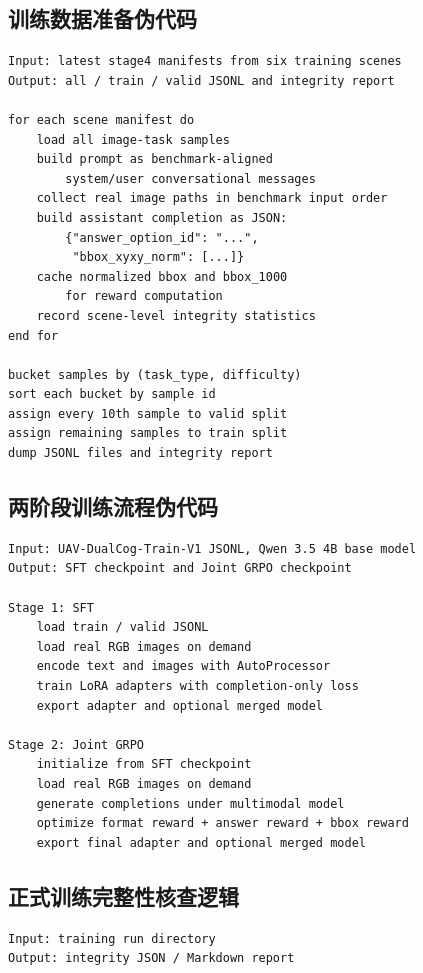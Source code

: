 \begin{thesisappendix}
\subsection{训练数据准备伪代码}

\begin{verbatim}
Input: latest stage4 manifests from six training scenes
Output: all / train / valid JSONL and integrity report

for each scene manifest do
    load all image-task samples
    build prompt as benchmark-aligned
        system/user conversational messages
    collect real image paths in benchmark input order
    build assistant completion as JSON:
        {"answer_option_id": "...",
         "bbox_xyxy_norm": [...]}
    cache normalized bbox and bbox_1000
        for reward computation
    record scene-level integrity statistics
end for

bucket samples by (task_type, difficulty)
sort each bucket by sample id
assign every 10th sample to valid split
assign remaining samples to train split
dump JSONL files and integrity report
\end{verbatim}

\subsection{两阶段训练流程伪代码}

\begin{verbatim}
Input: UAV-DualCog-Train-V1 JSONL, Qwen 3.5 4B base model
Output: SFT checkpoint and Joint GRPO checkpoint

Stage 1: SFT
    load train / valid JSONL
    load real RGB images on demand
    encode text and images with AutoProcessor
    train LoRA adapters with completion-only loss
    export adapter and optional merged model

Stage 2: Joint GRPO
    initialize from SFT checkpoint
    load real RGB images on demand
    generate completions under multimodal model
    optimize format reward + answer reward + bbox reward
    export final adapter and optional merged model
\end{verbatim}

\subsection{正式训练完整性核查逻辑}

\begin{verbatim}
Input: training run directory
Output: integrity JSON / Markdown report


\end{verbatim}
\end{thesisappendix}
